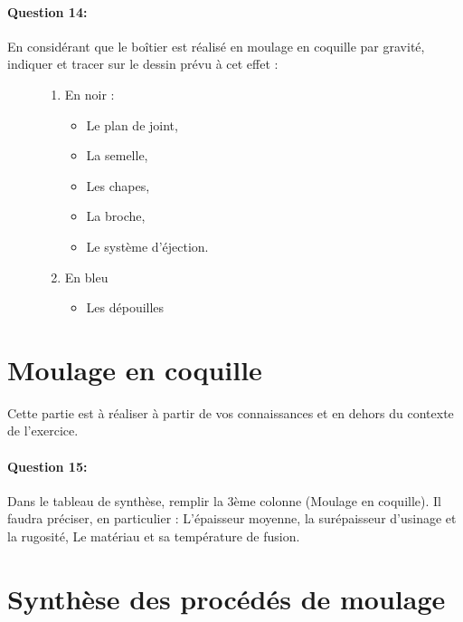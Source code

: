 \paragraph{Question 14:} En considérant que le boîtier est réalisé en moulage en coquille par gravité, indiquer et tracer sur le dessin prévu à cet effet :
\begin{figure}[!h]
 \begin{minipage}{0.49\linewidth}
\begin{enumerate}
 \item En noir :
 \begin{itemize}
  \item Le plan de joint,
  \item La semelle,
  \item Les chapes,
  \item La broche,
  \item Le système d'éjection.
 \end{itemize}
\end{enumerate}
 \end{minipage}
 \hfill
  \begin{minipage}{0.49\linewidth}
\begin{enumerate}
\setcounter{enumi}{1}
 \item En bleu
 \begin{itemize}
  \item Les dépouilles
 \end{itemize}
\end{enumerate}
 \end{minipage}
\end{figure}

\section{Moulage en coquille}

Cette partie est à réaliser à partir de vos connaissances et en dehors du contexte de l'exercice.

\paragraph{Question 15:} Dans le tableau de synthèse, remplir la 3ème colonne (Moulage en coquille). Il faudra préciser, en particulier :
L'épaisseur moyenne, la surépaisseur d'usinage et la rugosité,
Le matériau et sa température de fusion.

\section{Synthèse des procédés de moulage}
